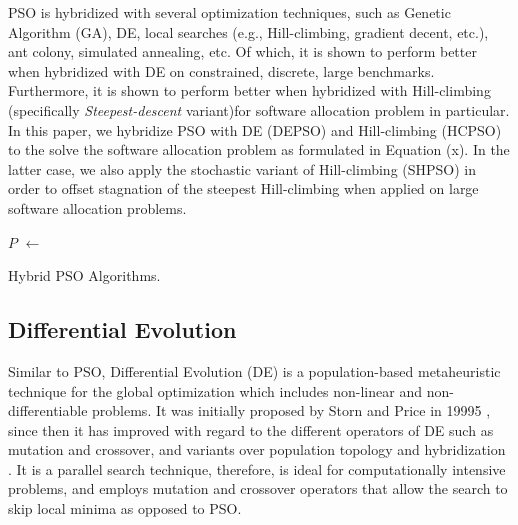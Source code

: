 PSO is hybridized with several optimization techniques, such as Genetic Algorithm (GA), DE, local searches (e.g., Hill-climbing, gradient decent, etc.), ant colony, simulated annealing, etc. Of which, it is shown to perform better when hybridized with DE on constrained, discrete, large benchmarks. Furthermore, it is shown to perform better when hybridized with Hill-climbing (specifically \textit{Steepest-descent} variant)for software allocation problem \cite{} in particular. In this paper, we hybridize PSO with DE (DEPSO) and Hill-climbing (HCPSO) to the solve the software allocation problem as formulated in Equation (x). In the latter case, we also apply the stochastic variant of Hill-climbing (SHPSO) in order to offset stagnation of the steepest Hill-climbing when applied on large software allocation problems.

\IncMargin{1em}
\begin{algorithm}[H]

\BlankLine
{}
\BlankLine
\Particles $P$ $\leftarrow$ \InitPSO{}\;
\BlankLine
{}
 \caption{Hybrid PSO Algorithms.}
 \label{alg_depso}
\end{algorithm}\DecMargin{1em}

\subsection{Differential Evolution}
Similar to PSO, Differential Evolution (DE) is a population-based metaheuristic technique for the global optimization which includes non-linear and non-differentiable problems. It was initially proposed by Storn and Price in 19995 \cite{Storn1997DifferentialSpaces}, since then it has improved with regard to the different operators of DE such as mutation and crossover, and variants over population topology and hybridization \cite{Das2016RecentSurvey}. It is a parallel search technique, therefore, is ideal for computationally intensive problems, and employs mutation and crossover operators that allow the search to skip local minima as opposed to PSO.

